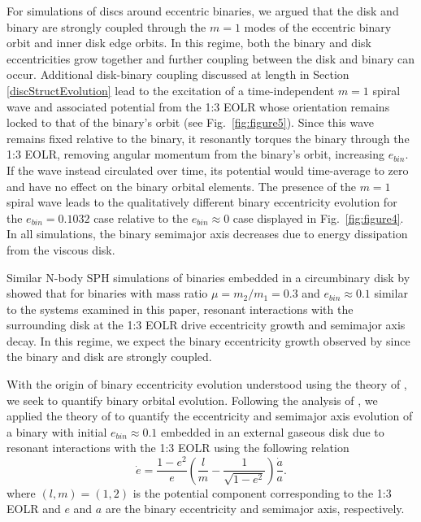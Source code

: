For simulations of discs around eccentric binaries, we argued that the disk and binary are strongly coupled through the $m = 1$ modes of the eccentric binary orbit and inner disk edge orbits.  In this regime, both the binary and disk eccentricities grow together and further coupling between the disk and binary can occur.  Additional disk-binary coupling discussed at length in Section \ref{discStructEvolution} lead to the excitation of a time-independent $m = 1$ spiral wave and associated potential from the 1:3 EOLR whose orientation remains locked to that of the binary's orbit (see Fig.~\ref{fig:figure5}).  Since this wave remains fixed relative to the binary, it resonantly torques the binary through the 1:3 EOLR, removing angular momentum from the binary's orbit, increasing $e_{bin}$.  If the wave instead circulated over time, its potential would time-average to zero and have no effect on the binary orbital elements.  The presence of the $m = 1$ spiral wave leads to the qualitatively different binary eccentricity evolution for the $e_{bin} = 0.1032$ case relative to the $e_{bin} \approx 0$ case displayed in Fig.~\ref{fig:figure4}.  In all simulations, the binary semimajor axis decreases due to energy dissipation from the viscous disk. 

 Similar N-body SPH simulations of
binaries embedded in a circumbinary disk by \citet{Artymowicz1991} showed that for binaries with mass ratio $\mu = m_2/m_1 = 0.3$ and $e_{bin} \approx 0.1$ similar to the systems examined in this paper, resonant interactions with the surrounding disk at the 1:3 EOLR drive eccentricity growth and semimajor axis decay.  In this regime, we expect the binary eccentricity growth observed by \citet{Artymowicz1991} since the binary and disk are strongly coupled.

With the origin of binary eccentricity evolution understood using
the theory of \citet{Papaloizou01}, we seek to quantify binary orbital
evolution.  Following the analysis of \citet{Dermine2013}, we applied the theory of \citet{Arty96b,Arty2000} to quantify the eccentricity and semimajor axis 
evolution of a binary with initial $e_{bin} \approx 0.1$ embedded in an external gaseous disk due to resonant interactions with the 1:3 EOLR using the following 
relation
\begin{equation} 
\label{eqn:deda}
\dot{e} = \frac{1 - e^2}{e} \left(\frac{l}{m} - \frac{1}{\sqrt{1 - e^2}}\right)\frac{\dot{a}}{a}.
\end{equation}
where $(l,m) = (1,2)$ is the potential component corresponding to the 1:3 EOLR \citep{Artymowicz1991,Arty2000} and $e$ and $a$ are the binary eccentricity and semimajor axis, respectively.

